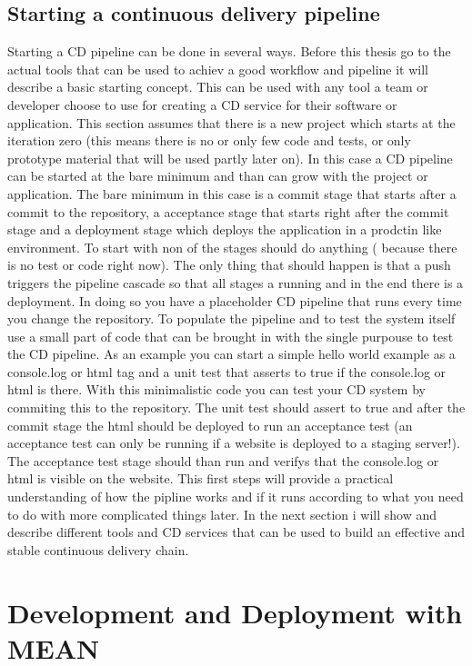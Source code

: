 \subsection{Starting a continuous delivery pipeline}
Starting a CD pipeline can be done in several ways. Before this thesis go to the actual tools that can be used to achiev a good workflow and pipeline
it will describe a basic starting concept. This can be used with any tool a team or developer choose to use for creating a CD service for their software
or application. This section assumes that there is a new project which starts at the iteration zero (this means there is no or only few code and tests, or
only prototype material that will be used partly later on). In this case a CD pipeline can be started at the bare minimum and than can grow with the project
or application. The bare minimum in this case is a commit stage that starts after a commit to the repository, a acceptance stage that starts right after the
commit stage and a deployment stage which deploys the application in a prodctin like environment. To start with non of the stages should do anything (
because there is no test or code right now). The only thing that should happen is that a push triggers the pipeline cascade so that all stages a running
and in the end there is a deployment. In doing so you have a placeholder CD pipeline that runs every time you change the repository. To populate the pipeline
and to test the system itself use a small part of code that can be brought in with the single purpouse to test the CD pipeline. As an example you can start a
simple hello world example as a console.log or html tag and a unit test that asserts to true if the console.log or html is there. With this minimalistic code
you can test your CD system by commiting this to the repository. The unit test should assert to true and after the commit stage the html should be deployed
to run an acceptance test (an acceptance test can only be running if a website is deployed to a staging server!). The acceptance test stage should than run
and verifys that the console.log or html is visible on the website. This first steps will provide a practical understanding of how the pipline works and
if it runs according to what you need to do with more complicated things later. In the next section i will show and describe different tools and CD services
that can be used to build an effective and stable continuous delivery chain.

\newpage


\section{Development and Deployment with MEAN}
\label{section:Development and Deployment with MEAN}

